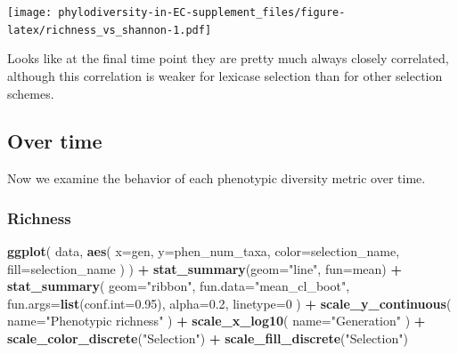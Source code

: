 \documentclass[]{book}
\newenvironment{Shaded}{\begin{snugshade}}{\end{snugshade}}
\newcommand{\DataTypeTok}[1]{\textcolor[rgb]{0.13,0.29,0.53}{#1}}
\newcommand{\DecValTok}[1]{\textcolor[rgb]{0.00,0.00,0.81}{#1}}
\newcommand{\FloatTok}[1]{\textcolor[rgb]{0.00,0.00,0.81}{#1}}
\newcommand{\KeywordTok}[1]{\textcolor[rgb]{0.13,0.29,0.53}{\textbf{#1}}}
\newcommand{\NormalTok}[1]{#1}
\newcommand{\OperatorTok}[1]{\textcolor[rgb]{0.81,0.36,0.00}{\textbf{#1}}}
\newcommand{\StringTok}[1]{\textcolor[rgb]{0.31,0.60,0.02}{#1}}
\begin{document}
\texttt{[image: phylodiversity-in-EC-supplement\_files/figure-latex/richness\_vs\_shannon-1.pdf]}

Looks like at the final time point they are pretty much always closely correlated, although this correlation is weaker for lexicase selection than for other selection schemes.

\hypertarget{over-time-2}{%
\subsection{Over time}\label{over-time-2}}

Now we examine the behavior of each phenotypic diversity metric over time.

\hypertarget{richness}{%
\subsubsection{Richness}\label{richness}}

\begin{Shaded}
\begin{Highlighting}[]
\KeywordTok{ggplot}\NormalTok{(}
\NormalTok{    data,}
    \KeywordTok{aes}\NormalTok{(}
      \DataTypeTok{x=}\NormalTok{gen,}
      \DataTypeTok{y=}\NormalTok{phen_num_taxa,}
      \DataTypeTok{color=}\NormalTok{selection_name,}
      \DataTypeTok{fill=}\NormalTok{selection_name}
\NormalTok{    )}
\NormalTok{  ) }\OperatorTok{+}
\StringTok{  }\KeywordTok{stat_summary}\NormalTok{(}\DataTypeTok{geom=}\StringTok{"line"}\NormalTok{, }\DataTypeTok{fun=}\NormalTok{mean) }\OperatorTok{+}
\StringTok{  }\KeywordTok{stat_summary}\NormalTok{(}
    \DataTypeTok{geom=}\StringTok{"ribbon"}\NormalTok{,}
    \DataTypeTok{fun.data=}\StringTok{"mean_cl_boot"}\NormalTok{,}
    \DataTypeTok{fun.args=}\KeywordTok{list}\NormalTok{(}\DataTypeTok{conf.int=}\FloatTok{0.95}\NormalTok{),}
    \DataTypeTok{alpha=}\FloatTok{0.2}\NormalTok{,}
    \DataTypeTok{linetype=}\DecValTok{0}
\NormalTok{  ) }\OperatorTok{+}
\StringTok{  }\KeywordTok{scale_y_continuous}\NormalTok{(}
    \DataTypeTok{name=}\StringTok{"Phenotypic richness"}
\NormalTok{  ) }\OperatorTok{+}
\StringTok{  }\KeywordTok{scale_x_log10}\NormalTok{(}
    \DataTypeTok{name=}\StringTok{"Generation"}
\NormalTok{  ) }\OperatorTok{+}
\StringTok{  }\KeywordTok{scale_color_discrete}\NormalTok{(}\StringTok{"Selection"}\NormalTok{) }\OperatorTok{+}\StringTok{ }
\StringTok{  }\KeywordTok{scale_fill_discrete}\NormalTok{(}\StringTok{"Selection"}\NormalTok{)}
\end{Highlighting}
\end{Shaded}
\end{document}
